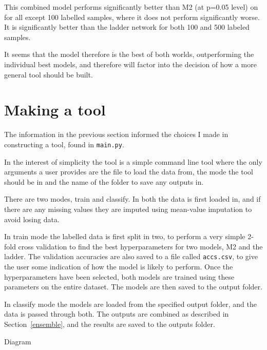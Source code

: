 This combined model performs significantly better than M2 (at p=0.05 level) on for all except 100 labelled samples, where it does not 
perform significantly worse. It is significantly better than the ladder network for both 100 and 500 labeled samples. 

It seems that the model therefore is the best of both worlds, outperforming the individual best models, and therefore will factor into 
the decision of how a more general tool should be built.

\section{Making a tool}

The information in the previous section informed the choices I made in constructing a tool, found in \texttt{main.py}.

In the interest of simplicity the tool is a simple command line tool where the  only arguments a user provides are the file to load the data 
from, the mode the tool should be in and the name of the folder to save any outputs in.

There are two modes, train and classify. In both the data is first loaded in, and if there are any missing values they are imputed using 
mean-value imputation to avoid losing data.

In train mode the labelled data is first split in two, to perform a very simple 2-fold cross validation to find the best hyperparameters for two 
models, M2 and the ladder. The validation accuracies are also saved to a file called \texttt{accs.csv}, to give the user some indication of
how the model is likely to perform.
Once the hyperparameters have been selected, both models are trained using these parameters on the entire dataset. The models are then 
saved to the output folder.

In classify mode the models are loaded from the specified output folder, and the data is passed through both. The outputs are combined 
as described in Section~\ref{ensemble}, and the results are saved to the outputs folder.

Diagram